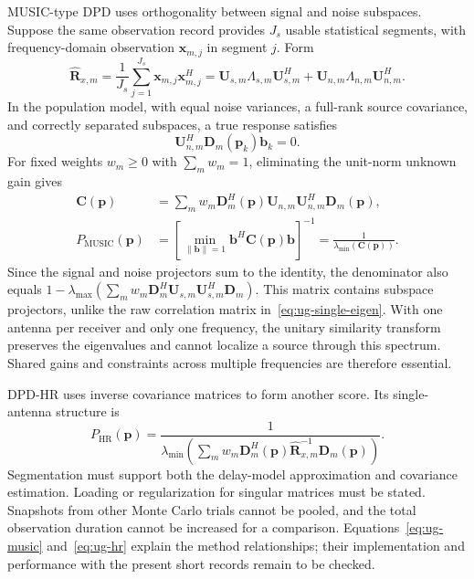 MUSIC-type DPD uses orthogonality between signal and noise subspaces\cite{ref04}. Suppose the same observation record provides $J_s$ usable statistical segments, with frequency-domain observation $\mathbf x_{m,j}$ in segment $j$. Form
\begin{equation}\label{eq:ug-covariance}
\widehat{\mathbf R}_{x,m}=\frac1{J_s}\sum_{j=1}^{J_s}\mathbf x_{m,j}\mathbf x_{m,j}^H
=\mathbf U_{s,m}\Lambda_{s,m}\mathbf U_{s,m}^H+
\mathbf U_{n,m}\Lambda_{n,m}\mathbf U_{n,m}^H.
\end{equation}
In the population model, with equal noise variances, a full-rank source covariance, and correctly separated subspaces, a true response satisfies
\[\mathbf U_{n,m}^H\mathbf D_m(\mathbf p_k)\mathbf b_k=0.\]
For fixed weights $w_m\geq0$ with $\sum_mw_m=1$, eliminating the unit-norm unknown gain gives
\begin{equation}\label{eq:ug-music}
\begin{aligned}
\mathbf C(\mathbf p)&=\sum_mw_m\mathbf D_m^H(\mathbf p)
\mathbf U_{n,m}\mathbf U_{n,m}^H\mathbf D_m(\mathbf p),\\
P_{\mathrm{MUSIC}}(\mathbf p)&=\left[
\min_{\|\mathbf b\|=1}\mathbf b^H\mathbf C(\mathbf p)\mathbf b\right]^{-1}
=\frac1{\lambda_{\min}(\mathbf C(\mathbf p))}.
\end{aligned}
\end{equation}
Since the signal and noise projectors sum to the identity, the denominator also equals $1-\lambda_{\max}(\sum_mw_m\mathbf D_m^H\mathbf U_{s,m}\mathbf U_{s,m}^H\mathbf D_m)$. This matrix contains subspace projectors, unlike the raw correlation matrix in~\eqref{eq:ug-single-eigen}. With one antenna per receiver and only one frequency, the unitary similarity transform preserves the eigenvalues and cannot localize a source through this spectrum. Shared gains and constraints across multiple frequencies are therefore essential.

DPD-HR uses inverse covariance matrices to form another score. Its single-antenna structure is\cite{ref06}
\begin{equation}\label{eq:ug-hr}
P_{\mathrm{HR}}(\mathbf p)=
\frac1{\lambda_{\min}\!\left(\sum_mw_m\mathbf D_m^H(\mathbf p)
\widehat{\mathbf R}_{x,m}^{-1}\mathbf D_m(\mathbf p)\right)}.
\end{equation}
Segmentation must support both the delay-model approximation and covariance estimation. Loading or regularization for singular matrices must be stated. Snapshots from other Monte Carlo trials cannot be pooled, and the total observation duration cannot be increased for a comparison. Equations~\eqref{eq:ug-music} and~\eqref{eq:ug-hr} explain the method relationships; their implementation and performance with the present short records remain to be checked.

